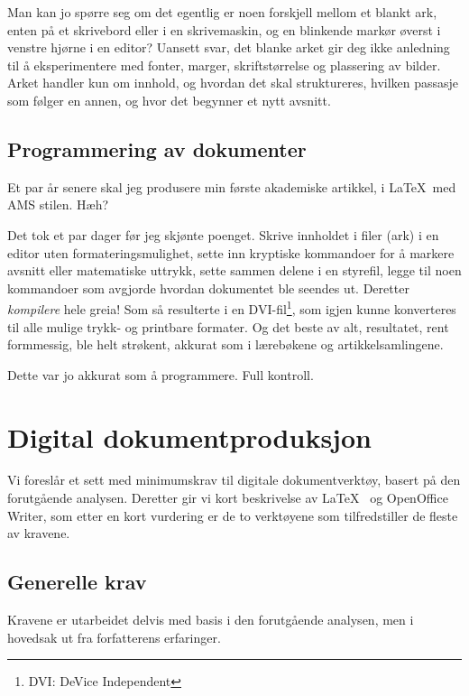 Man kan jo spørre seg om det egentlig er noen forskjell mellom et blankt ark, enten på et skrivebord eller i en skrivemaskin, og en blinkende markør øverst i venstre hjørne i en editor? Uansett svar, det blanke arket gir deg ikke anledning til å eksperimentere med fonter, marger, skriftstørrelse og plassering av bilder. Arket handler kun om innhold, og hvordan det skal struktureres, hvilken passasje som følger en annen, og hvor det begynner et nytt avsnitt.

\subsection{Programmering av dokumenter}

Et par år senere skal jeg produsere min første akademiske artikkel, i \LaTeX~med  AMS stilen. Hæh?

Det tok et par dager før jeg skjønte poenget. Skrive innholdet i filer (ark) i en editor uten formateringsmulighet, sette inn kryptiske kommandoer for å markere avsnitt eller matematiske uttrykk, sette sammen delene i en styrefil, legge til noen kommandoer som avgjorde hvordan dokumentet ble seendes ut. Deretter {\em kompilere} hele greia! Som så resulterte i  en DVI-fil\footnote{DVI: DeVice Independent}, som igjen kunne konverteres til alle mulige trykk- og printbare formater. Og det beste av alt, resultatet, rent formmessig, ble helt strøkent, akkurat som i lærebøkene og artikkelsamlingene.

Dette var jo akkurat som å programmere. Full kontroll.


\section{Digital dokumentproduksjon}

Vi foreslår et sett med minimumskrav til digitale dokumentverktøy, basert på  den forutgående analysen. Deretter gir vi kort beskrivelse av 
\LaTeX~ og OpenOffice Writer, som etter en kort vurdering er de to verktøyene som tilfredstiller de fleste av kravene.

\subsection{Generelle krav}
\label{sec:generelle-krav}

Kravene er utarbeidet delvis med basis i den forutgående analysen, men i hovedsak ut fra forfatterens erfaringer.

